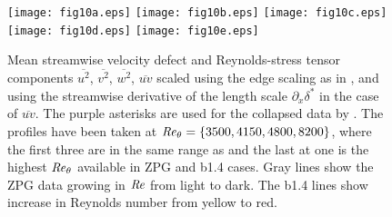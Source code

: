 \begin{figure}
\texttt{[image: fig10a.eps]}
\texttt{[image: fig10b.eps]}
\texttt{[image: fig10c.eps]}
\texttt{[image: fig10d.eps]}
\texttt{[image: fig10e.eps]}
\caption{Mean streamwise velocity defect and Reynolds-stress tensor components $\overline{u^2}$, $\overline{v^2}$, $\overline{w^2}$, $\overline{uv}$ scaled using the edge scaling as in \cite{Kitsios2016}, and using the streamwise derivative of the length scale $\partial_x \delta^*$ in the case of $\overline{uv}$. The purple asterisks are used for the collapsed data by \cite{Kitsios2016}. The profiles have been taken at $\mbox{\textit{Re}}_{\theta}=\{3500, 4150, 4800, 8200\}$, where the first three are in the same range as \cite{Kitsios2016} and the last at one is the highest $\mbox{\textit{Re}}_{\theta}$ available in ZPG and b1.4 cases. Gray lines show the ZPG data growing in $\mbox{\textit{Re}}$ from light to dark. The b1.4 lines show increase in Reynolds number from yellow to red.}
\label{fig:kitsios_scalings}
\end{figure}


